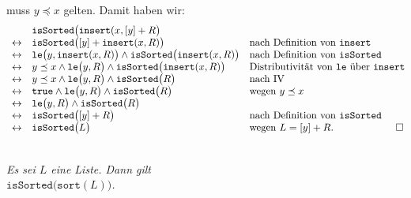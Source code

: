 \begin{enumerate}
            muss $y \preceq x$ gelten.  Damit haben wir:
            $$
            \begin{array}[b]{cll}
               & \mathtt{isSorted}\bigl( \mathtt{insert}(x, [y] + R\bigr) \\
             \leftrightarrow & \mathtt{isSorted}\bigl( [y] + \mathtt{insert}(x, R)\bigr)   & \mbox{nach Definition von $\mathtt{insert}$}\\
             \leftrightarrow & \mathtt{le}\bigl(y, \mathtt{insert}(x,R) \bigr) \wedge \mathtt{isSorted}\bigl( \mathtt{insert}(x,R)\bigr)   
                     & \mbox{nach Definition von $\mathtt{isSorted}$}\\
             \leftrightarrow & y \preceq x \wedge \mathtt{le}\bigl(y, R \bigr) \wedge \mathtt{isSorted}\bigl( \mathtt{insert}(x,R)\bigr)   
                     & \mbox{Distributivit\"at von \texttt{le} \"uber \texttt{insert}}\\
             \leftrightarrow & y \preceq x \wedge \mathtt{le}\bigl(y, R \bigr) \wedge \mathtt{isSorted}\bigl( R \bigr)   
                     & \mbox{nach IV}\\
             \leftrightarrow & \mathtt{true} \wedge \mathtt{le}\bigl(y, R \bigr) \wedge \mathtt{isSorted}\bigl( R \bigr)   
                     & \mbox{wegen $y \preceq x$}\\
             \leftrightarrow & \mathtt{le}\bigl(y, R \bigr) \wedge \mathtt{isSorted}\bigl( R \bigr)   \\
             \leftrightarrow & \mathtt{isSorted}\bigl( [y] + R \bigr)  &
                       \mbox{nach Definition von \texttt{isSorted}} \\
             \leftrightarrow & \mathtt{isSorted}\bigl( L \bigr)  &
                       \mbox{wegen $L = [y] + R$}. \\
            \end{array} \hspace*{-0.5cm} \Box
            $$
\end{enumerate}

\begin{Proposition} \hspace*{\fill}\\
{\em
  Es sei $L$ eine Liste. Dann gilt \\[0.1cm]
  \hspace*{1.3cm} $\mathtt{isSorted}\bigl(\mathtt{sort}(L) \bigr)$. 
}  
\end{Proposition}

